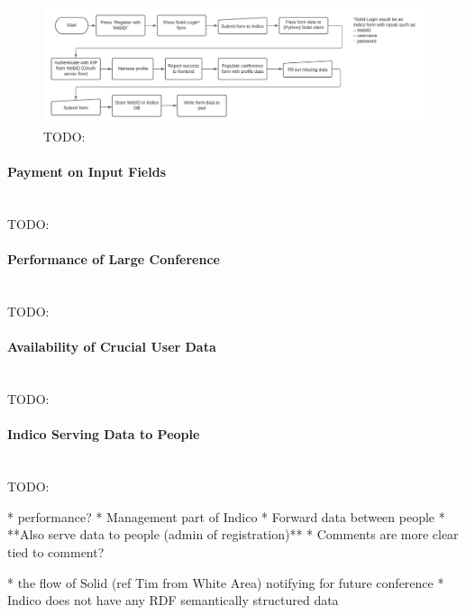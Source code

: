 \begin{figure}
    \centering
    \includegraphics[width=1\textwidth]{prototype/graphs/poc-conference_registration_flow-server_side-sideways.jpeg}
    \caption{TODO:}
    \label{fig:poc-conference_registration_flow-server_side-sideways}
\end{figure}

\vspace{0.5cm}
\paragraph{Payment on Input Fields}\mbox{}\\

TODO:
\vspace{0.5cm}
\paragraph{Performance of Large Conference}\mbox{}\\

TODO:
\vspace{0.5cm}
\paragraph{Availability of Crucial User Data}\mbox{}\\

TODO:
\vspace{0.5cm}
\paragraph{Indico Serving Data to People}\mbox{}\\

TODO:


* performance?
* Management part of Indico
  * Forward data between people
  * **Also serve data to people (admin of registration)**
* Comments are more clear tied to comment?

* the flow of Solid (ref Tim from White Area) notifying for future conference
* Indico does not have any RDF semantically structured data